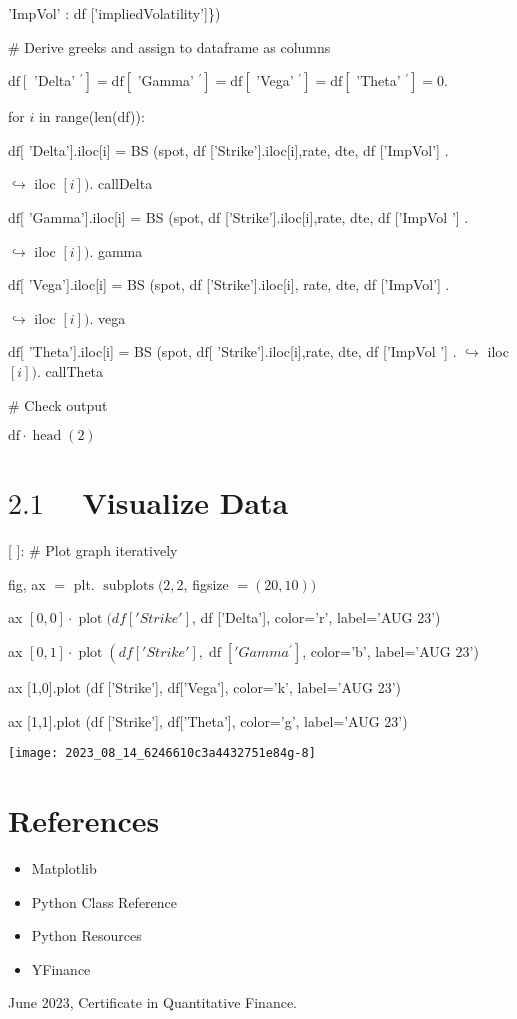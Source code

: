 \documentclass[10pt]{article}
\begin{document}
'ImpVol' : df ['impliedVolatility']\})

\# Derive greeks and assign to dataframe as columns

$\mathrm{df}\left[\right.$ 'Delta' $\left.^{\prime}\right]=\mathrm{df}\left[\right.$ 'Gamma' $\left.^{\prime}\right]=\mathrm{df}\left[\right.$ 'Vega' $\left.^{\prime}\right]=\mathrm{df}\left[\right.$ 'Theta' $\left.^{\prime}\right]=0$.

for $i$ in range(len(df)):

$\mathrm{df}[$ 'Delta'].iloc[i] = BS (spot, df ['Strike'].iloc[i],rate, dte, df ['ImpVol'] .

$\hookrightarrow$ iloc $[i])$. callDelta

$\mathrm{df}[$ 'Gamma'].iloc[i] = BS (spot, df ['Strike'].iloc[i],rate, dte, df ['ImpVol '] .

$\hookrightarrow$ iloc $[i])$. gamma

$\mathrm{df}[$ 'Vega'].iloc[i] = BS (spot, df ['Strike'].iloc[i], rate, dte, df ['ImpVol'] .

$\hookrightarrow$ iloc $[i])$. vega

$\mathrm{df}[$ 'Theta'].iloc[i] = BS (spot, $\mathrm{df}[$ 'Strike'].iloc[i],rate, dte, df ['ImpVol '] . $\hookrightarrow$ iloc $[i])$. callTheta

\# Check output

$\mathrm{df} \cdot \operatorname{head}(2)$

\section*{$2.1 \quad$ Visualize Data}
[ ]: \# Plot graph iteratively

fig, ax $=$ plt. $\operatorname{subplots}(2,2$, figsize $=(20,10))$

ax $[0,0] \cdot \operatorname{plot}(d f[' S t r i k e ']$, df ['Delta'], color='r', label='AUG 23')

ax $[0,1] \cdot \operatorname{plot}\left(d f[' S t r i k e '], \operatorname{df}\left[' G a m m a^{\prime}\right]\right.$, color='b', label='AUG 23')

ax [1,0].plot (df ['Strike'], df['Vega'], color='k', label='AUG 23')

ax [1,1].plot (df ['Strike'], df['Theta'], color='g', label='AUG 23')

\begin{center}
\texttt{[image: 2023\_08\_14\_6246610c3a4432751e84g-8]}
\end{center}

\section*{References}
\begin{itemize}
  \item Matplotlib

  \item Python Class Reference

  \item Python Resources

  \item YFinance

\end{itemize}

June 2023, Certificate in Quantitative Finance.
\end{document}
